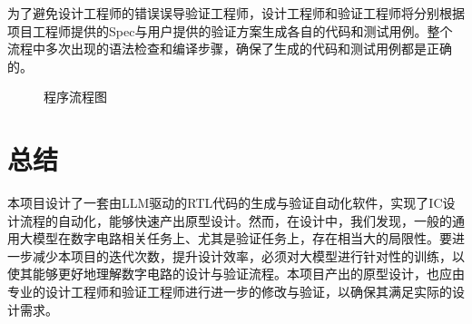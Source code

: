 \documentclass[UTF8]{ctexart}
\begin{document}
为了避免设计工程师的错误误导验证工程师，设计工程师和验证工程师将分别根据项目工程师提供的Spec与用户提供的验证方案生成各自的代码和测试用例。整个流程中多次出现的语法检查和编译步骤，确保了生成的代码和测试用例都是正确的。


\begin{figure}[H]
    \centering
    
    \caption{程序流程图}
    \label{fig:flowchart}
\end{figure}




\section{总结}
本项目设计了一套由LLM驱动的RTL代码的生成与验证自动化软件，实现了IC设计流程的自动化，能够快速产出原型设计。然而，在设计中，我们发现，一般的通用大模型在数字电路相关任务上、尤其是验证任务上，存在相当大的局限性。要进一步减少本项目的迭代次数，提升设计效率，必须对大模型进行针对性的训练，以使其能够更好地理解数字电路的设计与验证流程。本项目产出的原型设计，也应由专业的设计工程师和验证工程师进行进一步的修改与验证，以确保其满足实际的设计需求。
\end{document}
